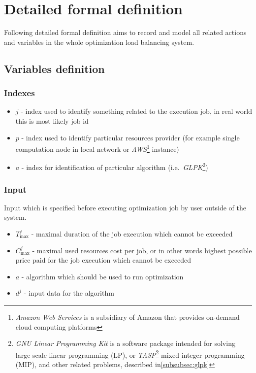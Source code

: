 
\section{Detailed formal definition}\label{sec:formal-definition-detailed}
Following detailed formal definition aims to record and model all related actions and variables in the whole optimization load balancing system.

\subsection{Variables definition}\label{subsec:detailed-variables-definition}

\subsubsection{Indexes}
\begin{itemize}
	\item $j$ - index used to identify something related to the execution job, in real world this is most likely job id
	\item $p$ - index used to identify particular resources provider (for example single computation node in local network
	      or \textit{AWS}\footnote{\textit{Amazon Web Services} is a subsidiary of Amazon that provides on-demand cloud computing platforms} instance)
	\item $a$ - index for identification of particular algorithm (i.e.\ \textit{GLPK}\footnote{\textit{GNU Linear Programming Kit} is a software package intended for solving large-scale linear programming (LP),
	      	or \textit{TASP}\footnote{\textit{Task and Asset Scheduling Platform} - proprietary optimization software developed by Blindspot Solutions, described in\ref{subsubsec:tasp}}
	      	mixed integer programming (MIP), and other related problems, described in\ref{subsubsec:glpk}})
\end{itemize}

\subsubsection{Input}
Input which is specified before executing optimization job by user outside of the system.

\begin{itemize}
	\item $T_{\max}^{j}$ - maximal duration of the job execution which cannot be exceeded
	\item $C_{\max}^{j}$ - maximal used resources cost per job, or in other words highest possible price paid for the job execution which cannot be exceeded
	\item $a$ - algorithm which should be used to run optimization
	\item $d^{j}$ - input data for the algorithm
\end{itemize}

